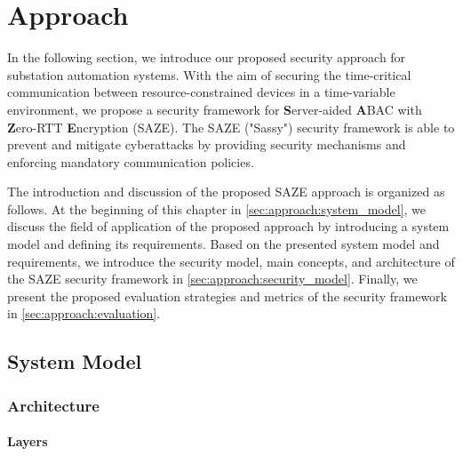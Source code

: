 \chapter{Approach}
\label{ch:approach}
In the following section, we introduce our proposed security approach for substation automation systems.
With the aim of securing the time-critical communication between resource-constrained devices in a time-variable environment, we propose a security framework for \textbf{S}erver-aided \textbf{A}BAC with \textbf{Z}ero-RTT \textbf{E}ncryption (SAZE).
The SAZE ("Sassy") security framework is able to prevent and mitigate cyberattacks by providing security mechanisms and enforcing mandatory communication policies.

The introduction and discussion of the proposed SAZE approach is organized as follows.
At the beginning of this chapter in \autoref{sec:approach:system_model}, we discuss the field of application of the proposed approach by introducing a system model and defining its requirements.
Based on the presented system model and requirements, we introduce the security model, main concepts, and architecture of the SAZE security framework in \autoref{sec:approach:security_model}.
Finally, we present the proposed evaluation strategies and metrics of the security framework in \autoref{sec:approach:evaluation}.

\section{System Model}
\label{sec:approach:system_model}

\subsection{Architecture}
\subsubsection{Layers}
